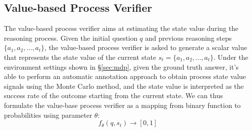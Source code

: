 \subsection{Value-based Process Verifier}
The value-based process verifier aims at estimating the state value during the reasoning process. Given the initial question $q$ and previous reasoning steps $\{a_1,a_2,...,a_t\}$, the value-based process verifier is asked to generate a scalar value that represents the state value of the current state $s_t=\{a_1,a_2,...,a_t\}$. Under the environment settings shown in \S\ref{sec:mdp}, given the ground truth answer, it's able to perform an automatic annotation approach to obtain process state value signals using the Monte Carlo method, and the state value is interpreted as the success rate of the outcome starting from the current state. We can thus formulate the value-base process verifier as a mapping from binary function to probabilities using parameter $\theta$:
\begin{equation}
    f_\theta(q, s_t)\rightarrow[0,1]
\end{equation}
